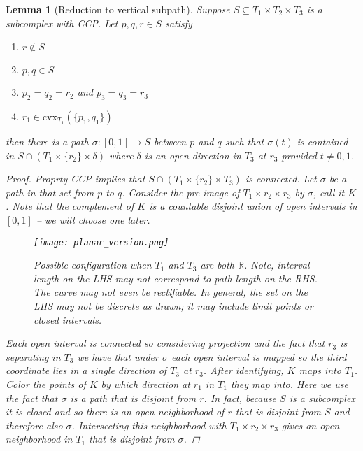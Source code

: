 \documentclass{article}
\theoremstyle{mystyle}
\newtheorem{lem}[thm]{Lemma}
\theoremstyle{remark}
\begin{document}
\begin{lem}
    [Reduction to vertical subpath]
    \label{lem:verticalsubpath} 
    Suppose \(S \subseteq T_{1} \times T_{2} \times T_{3} \) is a subcomplex with CCP. Let \(p,q,r \in S\) satisfy
    \begin{enumerate}
        \item \(r \not\in S\) 
        \item \(p,q \in S\) 
        \item \(p_{2} = q_{2} = r_{2}\) and \(p_{3} = q_{3} =r_{3}\)
        \item \(r_1 \in \text{cvx}_{T_{1}} (\{p_1,q_1\}) \) 
    \end{enumerate}
    then there is a path \(\sigma: [0,1] \to S\) between \(p\) and \(q\) such that \(\sigma(t)\) is contained in \(S \cap (T_{1} \times \{r_{2}\} \times \delta)\) where \(\delta\) is an open direction in \(T_{3}\) at \(r_{3}\) provided \(t \neq 0,1\).

    \begin{proof}
        Proprty CCP implies that \(S \cap (T_{1} \times \{r_{2}\} \times T_{3} )\) is connected. Let \(\sigma\) be a path in that set from \(p\) to \(q\). Consider the pre-image of \(T_{1} \times r_{2} \times r_{3}\) by \(\sigma\), call it \(K\). Note that the complement of \(K\) is a countable disjoint union of open intervals in \([0,1]\) -- we will choose one later. 
        
        \begin{figure}[htp]
    \centering
    \texttt{[image: planar\_version.png]}
    \caption{Possible configuration when $T_1$ and $T_3$ are both $\mathbb{R}$. Note, interval length on the LHS may not correspond to path length on the RHS. The curve may not even be rectifiable. In general, the set on the LHS may not be discrete as drawn; it may include limit points or closed intervals.}
    \label{fig:square}
\end{figure}
        
        Each open interval is connected so considering projection and the fact that \(r_{3}\) is separating in \(T_{3}\) we have that under \(\sigma\) each open interval is mapped so the third coordinate lies in a single direction of \(T_{3}\) at \(r_{3}\). After identifying, \(K\) maps into \(T_{1}\). Color the points of \(K\) by which direction at \(r_1\) in \(T_{1}\) they map into. Here we use the fact that \(\sigma\) is a path that is disjoint from \(r\). In fact, because \(S\) is a subcomplex it is closed and so there is an open neighborhood of \(r\) that is disjoint from \(S\) and therefore also  \(\sigma\). Intersecting this neighborhood with \(T_{1} \times r_{2} \times r_{3}\) gives an open neighborhood in \(T_{1}\) that is disjoint from \(\sigma\). 


\end{proof}
\end{lem}
\end{document}
